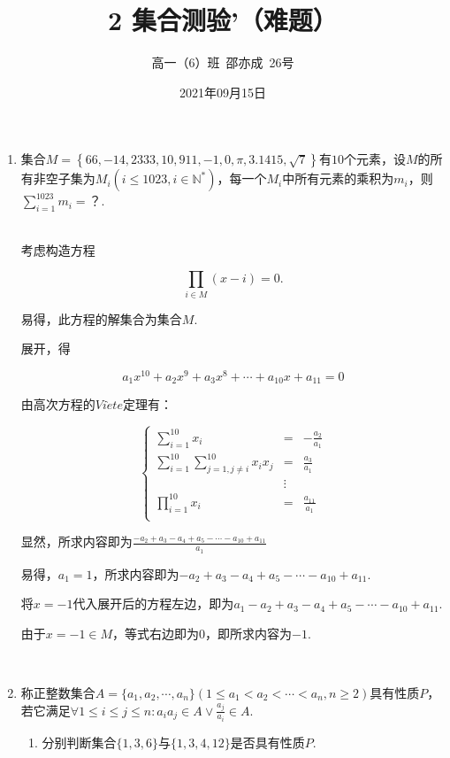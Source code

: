 \documentclass[8pt]{article}
\author{高一（6）班\ 邵亦成\ 26号}
\title{2 集合测验'（难题）}
\date{2021年09月15日}
\begin{document}
	\maketitle

	\begin{enumerate}

		\item
			集合$M=\left\{66,-14,2333,10,911,-1,0,\pi,3.1415,\sqrt{7}\right\}$有$10$个元素，设$M$的所有非空子集为$M_i \left(i\leq1023, i\in\mathbb{N}^{*}\right)$，每一个$M_i$中所有元素的乘积为$m_i$，则$\sum_{i=1}^{1023}{m_i}=$？.

			~\\

			考虑构造方程

			$$\prod_{i\in M}{(x-i)}=0.$$

			易得，此方程的解集合为集合$M$.

			展开，得

			$$a_1x^{10}+a_2x^9+a_3x^8+\cdots+a_{10}x+a_{11}=0$$

			由高次方程的$Vi\grave{e}te$定理有：

			$$
			\left\{
				\begin{aligned}
					\sum_{i=1}^{10}{x_i}&=&-\frac{a_2}{a_1}\\
					\sum_{i=1}^{10}{\sum_{j=1, j\neq i}^{10}{x_ix_j}}&=&\frac{a_3}{a_1}\\
					&\vdots&\\
					\prod_{i=1}^{10}{x_i}&=&\frac{a_{11}}{a_1}\\
				\end{aligned}
			\right.
			$$

			显然，所求内容即为$\frac{-a_2+a_3-a_4+a_5-\cdots-a_{10}+a_{11}}{a_1}$

			易得，$a_1=1$，所求内容即为$-a_2+a_3-a_4+a_5-\cdots-a_{10}+a_{11}$.

			将$x=-1$代入展开后的方程左边，即为$a_1-a_2+a_3-a_4+a_5-\cdots-a_{10}+a_{11}$.

			由于$x=-1\in M$，等式右边即为0，即所求内容为$-1$.

		~\\

		\item
			称正整数集合$A=\{a_1,a_2,\cdots,a_n\}(1\leq a_1 < a_2 < \cdots < a_n, n \geq 2)$具有性质$P$，若它满足$\forall 1\leq i\leq j\leq n: a_ia_j \in A \vee \frac{a_j}{a_i}\in A$.

			\begin{enumerate}[ (1) ]

				\item 分别判断集合$\{1,3,6\}$与$\{1,3,4,12\}$是否具有性质$P$.


\end{enumerate}
\end{enumerate}
\end{document}
